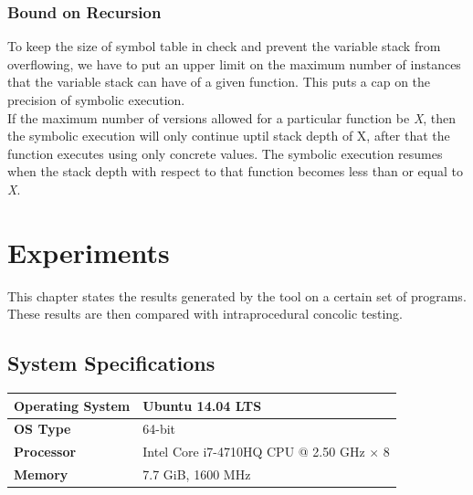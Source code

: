 \documentclass[12pt,oneside]{book}
\begin{document}
\subsection{Bound on Recursion}
To keep the size of symbol table in check and prevent the variable stack from overflowing, we have to put an upper limit on the maximum number of instances that the variable stack can have of a given function. This puts a cap on the precision of symbolic execution. \\
If the maximum number of versions allowed for a particular function be \textit{X}, then the symbolic execution will only continue uptil stack depth of X, after that the function executes using only concrete values. The symbolic execution resumes when the stack depth with respect to that function becomes less than or equal to \textit{X}.









\chapter{Experiments}
This chapter states the results generated by the tool on a certain set of programs. These results are then compared with intraprocedural concolic testing. 
\section{System Specifications}
\begin{table}[h]
\centering
\begin{tabular}{||l || l ||} 
 \hline
  \textbf{Operating System} & Ubuntu 14.04 LTS  \\ [1ex]
 \hline
   \textbf{OS Type} & 64-bit  \\[1ex]
 \hline
   \textbf{Processor} & Intel Core i7-4710HQ CPU @ 2.50 GHz $\times$ 8  \\ [1ex] 
  \hline
  \textbf{Memory} & 7.7 GiB, 1600 MHz  \\[1ex]
  \hline

\end{tabular}
\end{table}
\end{document}
